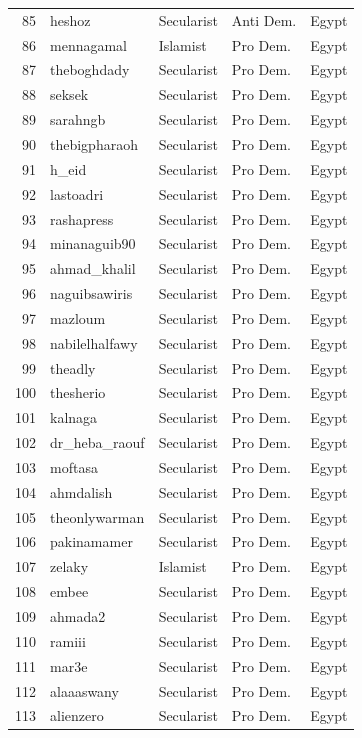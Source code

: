 \documentclass[12pt]{article}
\begin{document}
\begin{longtable}{rllll}
	85 & heshoz & Secularist & Anti Dem. & Egypt \\ 
	86 & mennagamal & Islamist & Pro Dem. & Egypt \\ 
	87 & theboghdady & Secularist & Pro Dem. & Egypt \\ 
	88 & seksek & Secularist & Pro Dem. & Egypt \\ 
	89 & sarahngb & Secularist & Pro Dem. & Egypt \\ 
	90 & thebigpharaoh & Secularist & Pro Dem. & Egypt \\ 
	91 & h\_eid & Secularist & Pro Dem. & Egypt \\ 
	92 & lastoadri & Secularist & Pro Dem. & Egypt \\ 
	93 & rashapress & Secularist & Pro Dem. & Egypt \\ 
	94 & minanaguib90 & Secularist & Pro Dem. & Egypt \\ 
	95 & ahmad\_khalil & Secularist & Pro Dem. & Egypt \\ 
	96 & naguibsawiris & Secularist & Pro Dem. & Egypt \\ 
	97 & mazloum & Secularist & Pro Dem. & Egypt \\ 
	98 & nabilelhalfawy & Secularist & Pro Dem. & Egypt \\ 
	99 & theadly & Secularist & Pro Dem. & Egypt \\ 
	100 & thesherio & Secularist & Pro Dem. & Egypt \\ 
	101 & kalnaga & Secularist & Pro Dem. & Egypt \\ 
	102 & dr\_heba\_raouf & Secularist & Pro Dem. & Egypt \\ 
	103 & moftasa & Secularist & Pro Dem. & Egypt \\ 
	104 & ahmdalish & Secularist & Pro Dem. & Egypt \\ 
	105 & theonlywarman & Secularist & Pro Dem. & Egypt \\ 
	106 & pakinamamer & Secularist & Pro Dem. & Egypt \\ 
	107 & zelaky & Islamist & Pro Dem. & Egypt \\ 
	108 & embee & Secularist & Pro Dem. & Egypt \\ 
	109 & ahmada2 & Secularist & Pro Dem. & Egypt \\ 
	110 & ramiii & Secularist & Pro Dem. & Egypt \\ 
	111 & mar3e & Secularist & Pro Dem. & Egypt \\ 
	112 & alaaaswany & Secularist & Pro Dem. & Egypt \\ 
	113 & alienzero & Secularist & Pro Dem. & Egypt \\ 

\end{longtable}
\end{document}
